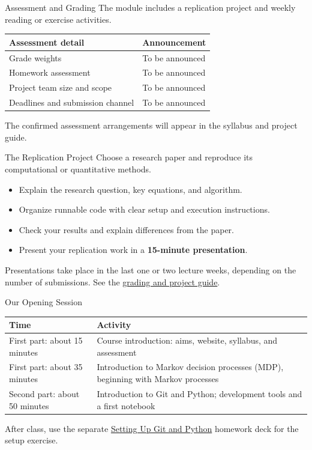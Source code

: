 \begin{frame}{Assessment and Grading}
The module includes a replication project and weekly reading or exercise activities.
\par\medskip
\begin{tabularx}{\linewidth}{@{}lY@{}}
\toprule\textbf{Assessment detail} & \textbf{Announcement}\\\midrule
Grade weights & To be announced\\
Homework assessment & To be announced\\
Project team size and scope & To be announced\\
Deadlines and submission channel & To be announced\\\bottomrule
\end{tabularx}
\par\medskip
The confirmed assessment arrangements will appear in the syllabus and project guide.
\end{frame}

\begin{frame}{The Replication Project}
Choose a research paper and reproduce its computational or quantitative methods.
\begin{itemize}
\item Explain the research question, key equations, and algorithm.
\item Organize runnable code with clear setup and execution instructions.
\item Check your results and explain differences from the paper.
\item Present your replication work in a \textbf{15-minute presentation}.
\end{itemize}
\medskip
Presentations take place in the last one or two lecture weeks, depending on the number of submissions. See the \href{https://yaolangzhong.github.io/U_Tokyo_Comp_Econ_Course/project.html}{grading and project guide}.
\end{frame}

\begin{frame}{Our Opening Session}
\begin{tabularx}{\linewidth}{@{}lY@{}}
\toprule\textbf{Time} & \textbf{Activity}\\\midrule
First part: about 15 minutes & Course introduction: aims, website, syllabus, and assessment\\
First part: about 35 minutes & Introduction to Markov decision processes (MDP), beginning with Markov processes\\
Second part: about 50 minutes & Introduction to Git and Python; development tools and a first notebook\\\bottomrule
\end{tabularx}
\par\medskip
After class, use the separate \href{https://yaolangzhong.github.io/U_Tokyo_Comp_Econ_Course/downloads/week_01/homework/Setting_Up_Git_and_Python.pdf}{Setting Up Git and Python} homework deck for the setup exercise.
\end{frame}

